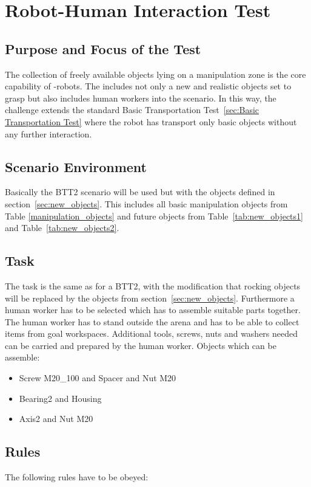\newpage
\section{Robot-Human Interaction Test}

\subsection{Purpose and Focus of the Test}
The collection of freely available objects lying on a manipulation zone is the core capability of \RCAW-robots. The  includes not only a new and realistic objects set to grasp but also includes human workers into the scenario. In this way, the challenge extends the standard Basic Transportation Test~\ref{sec:Basic Transportation Test} where the robot has transport only basic objects without any further interaction. 

\subsection{Scenario Environment}
Basically the BTT2 scenario will be used but with the objects defined in section~\ref{sec:new_objects}. This includes all basic manipulation objects from Table \ref{manipulation_objects} and future objects from Table~\ref{tab:new_objects1} and Table~\ref{tab:new_objects2}.

\subsection{Task}
The task is the same as for a BTT2, with the modification that rocking objects will be replaced by the objects from section~\ref{sec:new_objects}. Furthermore a human worker has to be selected which has to assemble suitable parts together. The human worker has to stand outside the arena and has to be able to collect items from goal workspaces. Additional tools, screws, nuts and washers needed can be carried and prepared by the human worker.
Objects which can be assemble: 
\begin{itemize}
	\item Screw M20\_100 and Spacer and Nut M20
	\item Bearing2 and  Housing
	\item Axis2 and Nut M20  
\end{itemize}

\subsection{Rules}
The following rules have to be obeyed:

